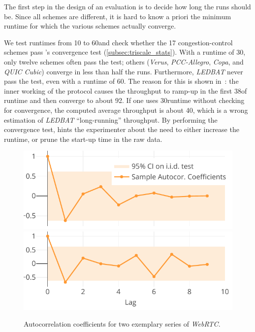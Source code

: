 The first step in the design of an evaluation is to decide how long the runs should be.
Since all schemes are different, it is hard to know a priori the minimum runtime for which the various schemes actually converge.

We test runtimes from 10 to 60\s and check whether the 17 congestion-control schemes pass \triscale's convergence test (\cref{subsec:triscale_stats}).
With a runtime of 30\s, only twelve schemes often pass the test; others (\textit{Verus}, \textit{PCC-Allegro}, \textit{Copa}, and \textit{QUIC Cubic}) converge in less than half the runs.
Furthermore, \textit{LEDBAT} never pass the test, even with a runtime of 60\s.
The reason for this is shown in~: the inner working of the protocol causes the throughput to ramp-up in the first 38\s of runtime and then converge to about 92\mbps.
If one uses 30\s runtime without checking for convergence, the computed average throughput is about 40\mbps, which is a wrong estimation of \textit{LEDBAT} ``long-running'' throughput.
By performing the convergence test, \triscale hints the experimenter about the need to either increase the runtime, or prune the start-up time in the raw data.

\begin{figure}
    \centering
   	\href{\triscalefig{Figure-5}}{
    \includegraphics[scale=1]{Figures/plot_webrtc_autocorr_passed.pdf}}\\
   	\href{\triscalefig{Figure-5}}{
    \includegraphics[scale=1]{Figures/plot_webrtc_autocorr_failed.pdf}}
    \caption{Autocorrelation coefficients for two exemplary series of \textit{WebRTC}.
    }
    \label{fig:webrtc_autocorr}
    \vspace{-1cm}
\end{figure}

